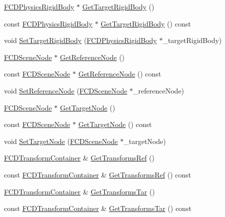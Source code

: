 \begin{DoxyCompactItemize}
\hyperlink{classFCDPhysicsRigidBody}{FCDPhysicsRigidBody} $\ast$ \hyperlink{classFCDPhysicsRigidConstraint_aa19d38ffd2893188fe1045b9f0fc57c0}{GetTargetRigidBody} ()
\item 
const \hyperlink{classFCDPhysicsRigidBody}{FCDPhysicsRigidBody} $\ast$ \hyperlink{classFCDPhysicsRigidConstraint_a1f5f716e35b3a73fe42cf995d5d27e8f}{GetTargetRigidBody} () const 
\item 
void \hyperlink{classFCDPhysicsRigidConstraint_ae3054b2ef168bc99dd265eba23048129}{SetTargetRigidBody} (\hyperlink{classFCDPhysicsRigidBody}{FCDPhysicsRigidBody} $\ast$\_\-targetRigidBody)
\item 
\hyperlink{classFCDSceneNode}{FCDSceneNode} $\ast$ \hyperlink{classFCDPhysicsRigidConstraint_aecfa72ef738ace21c10a690baf2022b2}{GetReferenceNode} ()
\item 
const \hyperlink{classFCDSceneNode}{FCDSceneNode} $\ast$ \hyperlink{classFCDPhysicsRigidConstraint_ab46b1e054faaaed8a67fcea806e27da4}{GetReferenceNode} () const 
\item 
void \hyperlink{classFCDPhysicsRigidConstraint_aeb92802f7e8ee0b97353c88a4baa766e}{SetReferenceNode} (\hyperlink{classFCDSceneNode}{FCDSceneNode} $\ast$\_\-referenceNode)
\item 
\hyperlink{classFCDSceneNode}{FCDSceneNode} $\ast$ \hyperlink{classFCDPhysicsRigidConstraint_afe91ca21e513e5087b3ca85d9c1b618e}{GetTargetNode} ()
\item 
const \hyperlink{classFCDSceneNode}{FCDSceneNode} $\ast$ \hyperlink{classFCDPhysicsRigidConstraint_afb0f19a82ccf6bb4025245096d1ec652}{GetTargetNode} () const 
\item 
void \hyperlink{classFCDPhysicsRigidConstraint_a6771e3e5c69b0372c054a2b385618ba7}{SetTargetNode} (\hyperlink{classFCDSceneNode}{FCDSceneNode} $\ast$\_\-targetNode)
\item 
\hyperlink{classFUObjectContainer}{FCDTransformContainer} \& \hyperlink{classFCDPhysicsRigidConstraint_a65d0a0e27da18419ca1ef2c239ec269e}{GetTransformsRef} ()
\item 
const \hyperlink{classFUObjectContainer}{FCDTransformContainer} \& \hyperlink{classFCDPhysicsRigidConstraint_ae24b5ae4e20e8a0556764fe638dc6d40}{GetTransformsRef} () const 
\item 
\hyperlink{classFUObjectContainer}{FCDTransformContainer} \& \hyperlink{classFCDPhysicsRigidConstraint_aec006086f6071ba2ecf3d6bda8f436d1}{GetTransformsTar} ()
\item 
const \hyperlink{classFUObjectContainer}{FCDTransformContainer} \& \hyperlink{classFCDPhysicsRigidConstraint_a6121e2a0bc57e7cb9ff19f903dfbc4c2}{GetTransformsTar} () const 

\end{DoxyCompactItemize}
